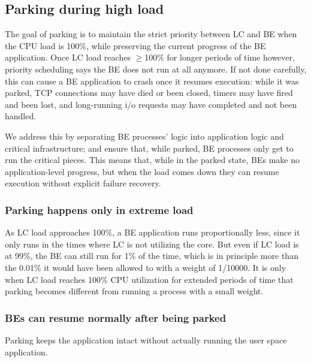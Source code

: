 \subsection{Parking during high load}\label{ss:approach:parking}

The goal of parking is to maintain the strict priority between LC and BE when
the CPU load is 100\%, while preserving the current progress of the BE
application. Once LC load reaches $\geq$100\% for longer periods of time
however, priority scheduling says the BE does not run at all anymore. If not
done carefully, this can cause a BE application to crash once it resumes
execution: while it was parked, TCP connections may have died or been closed,
timers may have fired and been lost, and long-running i/o requests may have
completed and not been handled.

We address this by separating BE processes' logic into application logic and
critical infrastructure; and ensure that, while parked, BE processes only get to
run the critical pieces. This means that, while in the parked state, BEs make no
application-level progress, but when the load comes down they can resume
execution without explicit failure recovery.

\subsubsection{Parking happens only in extreme load}
As LC load approaches 100\%, a BE application runs proportionally less, since it
only runs in the times where LC is not utilizing the core. But even if LC load
is at 99\%, the BE can still run for 1\% of the time, which is in principle more
than the 0.01\% it would have been allowed to with a weight of 1/10000. It is
only when LC load reaches 100\% CPU utilization for extended periods of time
that parking becomes different from running a process with a small weight.

\subsubsection{BEs can resume normally after being parked }
Parking keeps the application intact without actually running the
user space application.  

